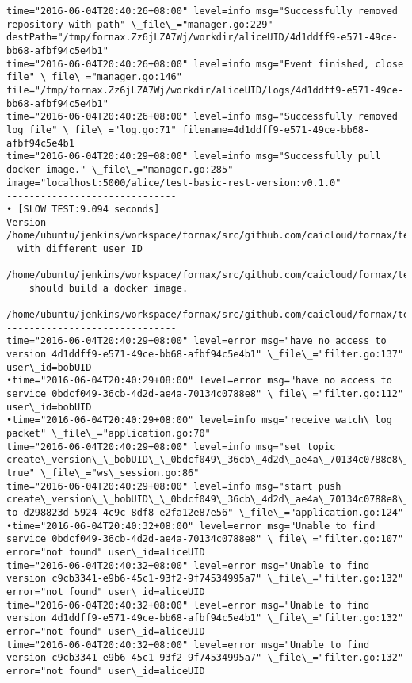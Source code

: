 \begin{lstlisting}[caption={Fornax功能性测试日志}]
time="2016-06-04T20:40:26+08:00" level=info msg="Successfully removed repository with path" \_file\_="manager.go:229" destPath="/tmp/fornax.Zz6jLZA7Wj/workdir/aliceUID/4d1ddff9-e571-49ce-bb68-afbf94c5e4b1" 
time="2016-06-04T20:40:26+08:00" level=info msg="Event finished, close file" \_file\_="manager.go:146" file="/tmp/fornax.Zz6jLZA7Wj/workdir/aliceUID/logs/4d1ddff9-e571-49ce-bb68-afbf94c5e4b1" 
time="2016-06-04T20:40:26+08:00" level=info msg="Successfully removed log file" \_file\_="log.go:71" filename=4d1ddff9-e571-49ce-bb68-afbf94c5e4b1 
time="2016-06-04T20:40:29+08:00" level=info msg="Successfully pull docker image." \_file\_="manager.go:285" image="localhost:5000/alice/test-basic-rest-version:v0.1.0" 
------------------------------
• [SLOW TEST:9.094 seconds]
Version
/home/ubuntu/jenkins/workspace/fornax/src/github.com/caicloud/fornax/tests/version/version\_test.go:374
  with different user ID
  /home/ubuntu/jenkins/workspace/fornax/src/github.com/caicloud/fornax/tests/version/version\_test.go:284
    should build a docker image.
    /home/ubuntu/jenkins/workspace/fornax/src/github.com/caicloud/fornax/tests/version/version\_test.go:267
------------------------------
time="2016-06-04T20:40:29+08:00" level=error msg="have no access to version 4d1ddff9-e571-49ce-bb68-afbf94c5e4b1" \_file\_="filter.go:137" user\_id=bobUID 
•time="2016-06-04T20:40:29+08:00" level=error msg="have no access to service 0bdcf049-36cb-4d2d-ae4a-70134c0788e8" \_file\_="filter.go:112" user\_id=bobUID 
•time="2016-06-04T20:40:29+08:00" level=info msg="receive watch\_log packet" \_file\_="application.go:70" 
time="2016-06-04T20:40:29+08:00" level=info msg="set topic create\_version\_\_bobUID\_\_0bdcf049\_36cb\_4d2d\_ae4a\_70134c0788e8\_\_4d1ddff9\_e571\_49ce\_bb68\_afbf94c5e4b1 true" \_file\_="ws\_session.go:86" 
time="2016-06-04T20:40:29+08:00" level=info msg="start push create\_version\_\_bobUID\_\_0bdcf049\_36cb\_4d2d\_ae4a\_70134c0788e8\_\_4d1ddff9\_e571\_49ce\_bb68\_afbf94c5e4b1 to d298823d-5924-4c9c-8df8-e2fa12e87e56" \_file\_="application.go:124" 
•time="2016-06-04T20:40:32+08:00" level=error msg="Unable to find service 0bdcf049-36cb-4d2d-ae4a-70134c0788e8" \_file\_="filter.go:107" error="not found" user\_id=aliceUID 
time="2016-06-04T20:40:32+08:00" level=error msg="Unable to find version c9cb3341-e9b6-45c1-93f2-9f74534995a7" \_file\_="filter.go:132" error="not found" user\_id=aliceUID 
time="2016-06-04T20:40:32+08:00" level=error msg="Unable to find version 4d1ddff9-e571-49ce-bb68-afbf94c5e4b1" \_file\_="filter.go:132" error="not found" user\_id=aliceUID 
time="2016-06-04T20:40:32+08:00" level=error msg="Unable to find version c9cb3341-e9b6-45c1-93f2-9f74534995a7" \_file\_="filter.go:132" error="not found" user\_id=aliceUID 

\end{lstlisting}
